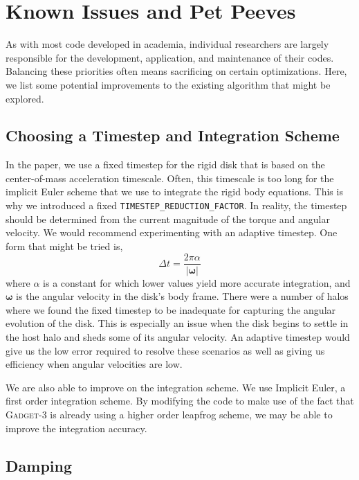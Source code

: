 \section{Known Issues and Pet Peeves}

As with most code developed in academia, individual researchers are largely responsible for the development, application, and maintenance of their codes. Balancing these priorities often means sacrificing on certain optimizations. Here, we list some potential improvements to the existing algorithm that might be explored.

\subsection{Choosing a Timestep and Integration Scheme}

In the paper, we use a fixed timestep for the rigid disk that is based on the center-of-mass acceleration timescale. Often, this timescale is too long for the implicit Euler scheme that we use to integrate the rigid body equations. This is why we introduced a fixed \texttt{TIMESTEP\_REDUCTION\_FACTOR}. In reality, the timestep should be determined from the current magnitude of the torque and angular velocity. We would recommend experimenting with an adaptive timestep. One form that might be tried is,
\begin{equation}
\Delta t = \frac{2 \pi \alpha}{\vert \boldsymbol \omega \vert}
\end{equation}
where $\alpha$ is a constant for which lower values yield more accurate integration, and $\boldsymbol \omega$ is the angular velocity in the disk's body frame. There were a number of halos where we found the fixed timestep to be inadequate for capturing the angular evolution of the disk. This is especially an issue when the disk begins to settle in the host halo and sheds some of its angular velocity. An adaptive timestep would give us the low error required to resolve these scenarios as well as giving us efficiency when angular velocities are low.

We are also able to improve on the integration scheme. We use Implicit Euler, a first order integration scheme. By modifying the code to make use of the fact that \textsc{Gadget-3} is already using a higher order leapfrog scheme, we may be able to improve the integration accuracy.

\subsection{Damping}

